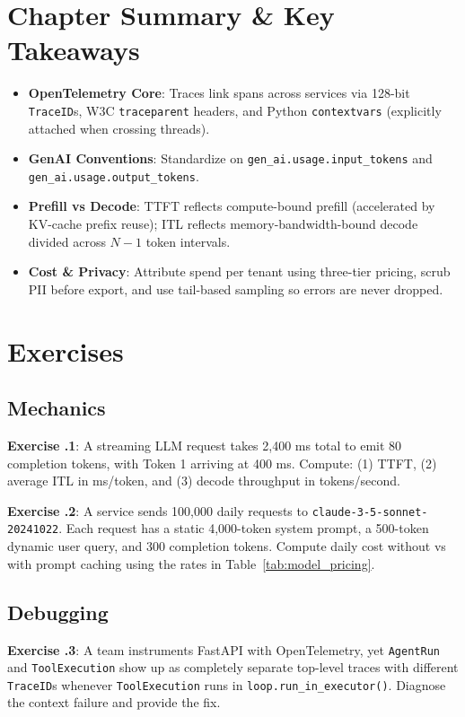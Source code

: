 \section{Chapter Summary \protect\& Key Takeaways}
\begin{itemize}[leftmargin=18pt]
  \item \textbf{OpenTelemetry Core}: Traces link spans across services via 128-bit \texttt{TraceID}s, W3C \texttt{traceparent} headers, and Python \texttt{contextvars} (explicitly attached when crossing threads).
  \item \textbf{GenAI Conventions}: Standardize on \texttt{gen\_ai.usage.input\_tokens} and \texttt{gen\_ai.usage.output\_tokens}.
  \item \textbf{Prefill vs Decode}: TTFT reflects compute-bound prefill (accelerated by KV-cache prefix reuse); ITL reflects memory-bandwidth-bound decode divided across $N - 1$ token intervals.
  \item \textbf{Cost \& Privacy}: Attribute spend per tenant using three-tier pricing, scrub PII before export, and use tail-based sampling so errors are never dropped.
\end{itemize}

\section{Exercises}

\subsection*{Mechanics}
\textbf{Exercise \thechapter.1}: A streaming LLM request takes 2,400 ms total to emit 80 completion tokens, with Token 1 arriving at 400 ms. Compute: (1) TTFT, (2) average ITL in ms/token, and (3) decode throughput in tokens/second.

\textbf{Exercise \thechapter.2}: A service sends 100,000 daily requests to \texttt{claude-3-5-sonnet-20241022}. Each request has a static 4,000-token system prompt, a 500-token dynamic user query, and 300 completion tokens. Compute daily cost without vs with prompt caching using the rates in Table~\ref{tab:model_pricing}.

\subsection*{Debugging}
\textbf{Exercise \thechapter.3}: A team instruments FastAPI with OpenTelemetry, yet \texttt{AgentRun} and \texttt{ToolExecution} show up as completely separate top-level traces with different \texttt{TraceID}s whenever \texttt{ToolExecution} runs in \texttt{loop.run\_in\_executor()}. Diagnose the context failure and provide the fix.

